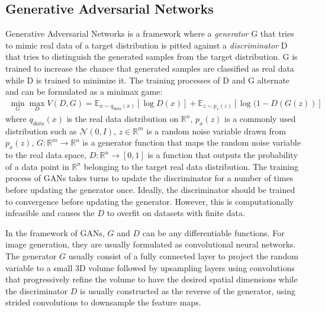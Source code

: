 \documentclass{article} %
\begin{document}
\subsection{Generative Adversarial Networks}
Generative Adversarial Networks \citep{goodfellow2014generative} is a framework where a \textit{generator} G that tries to mimic real data of a target distribution is pitted against a \textit{discriminator} D that tries to distinguish the generated samples from the target distribution. G is trained to increase the chance that generated samples are classified as real data while D is trained to minimize it. The training processes of D and G alternate and can be formulated as a minimax game:
\begin{align}
\min_{G} \max_{D} V(D,G) = \mathbb{E}_{x \sim q_{data}(x)}[\log{D(x)}] + \mathbb{E}_{z \sim p_{x}(z)}[\log{(1-D(G(z))}]
\end{align}
where $q_{data}(x)$ is the real data distribution on $\mathbb{R}^n$, $p_{x}(z)$ is a commonly used distribution such as $\mathcal{N}(0,I)$, $z \in \mathbb{R}^{m}$ is a random noise variable drawn from $p_{x}(z)$, $G:\mathbb{R}^m \rightarrow \mathbb{R}^n$ is a generator function that maps the random noise variable to the real data space, $D:\mathbb{R}^n \rightarrow [0,1]$ is a function that outputs the probability of a data point in $\mathbb{R}^n$ belonging to the target real data distribution. 
The training process of GANs takes turns to update the discriminator for a number of times before updating the generator once. Ideally, the discriminator should be trained to convergence before updating the generator. However, this is computationally infeasible and causes the $D$ to overfit on datasets with finite data. \par
In the framework of GANs, $G$ and $D$ can be any differentiable functions. For image generation, they are usually formulated as convolutional neural networks. The generator $G$ usually consist of a fully connected layer to project the random variable to a small 3D volume followed by upsampling layers using convolutions that progressively refine the volume to have the desired spatial dimensions while the discriminator $D$ is usually constructed as the reverse of the generator, using strided convolutions to downsample the feature maps.
\end{document}
